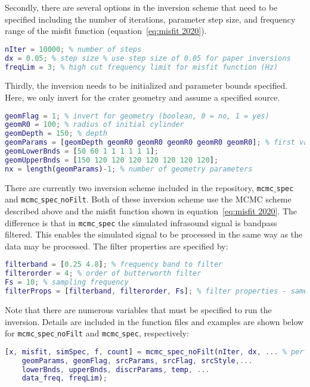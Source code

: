\documentclass[10pt]{article}
\begin{document}
Secondly, there are several options in the inversion scheme that need to be specified including the number of iterations, parameter step size, and frequency range of the misfit function (equation~\ref{eq:misfit 2020}).
\begin{lstlisting}[language=Matlab]
nIter = 10000; % number of steps
dx = 0.05; % step size % use step size of 0.05 for paper inversions
freqLim = 3; % high cut frequency limit for misfit function (Hz)
\end{lstlisting}

Thirdly, the inversion needs to be initialized and parameter bounds specified. Here, we only invert for the crater geometry and assume a specified source. 
\begin{lstlisting}[language=Matlab]
geomFlag = 1; % invert for geometry (boolean, 0 = no, 1 = yes)
geomR0 = 100; % radius of initial cylinder
geomDepth = 150; % depth 
geomParams = [geomDepth geomR0 geomR0 geomR0 geomR0 geomR0]; % first value is depth, other values are radius points that are equally spaced
geomLowerBnds = [50 60 1 1 1 1 1 1];
geomUpperBnds = [150 120 120 120 120 120 120 120];
nx = length(geomParams)-1; % number of geometry parameters
\end{lstlisting}

There are currently two inversion scheme included in the repository, \texttt{mcmc$\_$spec} and \texttt{mcmc$\_$spec$\_$noFilt}. Both of these inversion scheme use the MCMC scheme described above and the misfit function shown in equation~\ref{eq:misfit 2020}. The difference is that in \texttt{mcmc$\_$spec} the simulated infrasound signal is bandpass filtered. This enables the simulated signal to be processed in the same way as the data may be processed. The filter properties are specified by:
\begin{lstlisting}[language=Matlab]
filterband = [0.25 4.8]; % frequency band to filter
filterorder = 4; % order of butterworth filter
Fs = 10; % sampling frequency
filterProps = [filterband, filterorder, Fs]; % filter properties - same as for data
\end{lstlisting}

Note that there are numerous variables that must be specified to run the inversion. Details are included in the function files and examples are shown below for \texttt{mcmc$\_$spec$\_$noFilt} and \texttt{mcmc$\_$spec}, respectively:

\begin{lstlisting}[language=Matlab]
[x, misfit, simSpec, f, count] = mcmc_spec_noFilt(nIter, dx, ... % perform MCMC inversion
    geomParams, geomFlag, srcParams, srcFlag, srcStyle,...
    lowerBnds, upperBnds, discrParams, temp, ...
    data_freq, freqLim);
\end{lstlisting}
\end{document}
